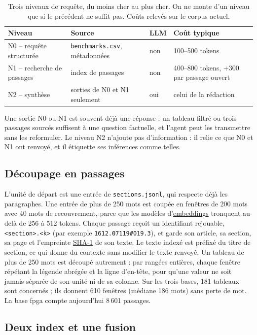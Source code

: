 \documentclass[11pt,a4paper]{article}
\newcommand{\cmd}[1]{\texttt{#1}}
\newcommand{\gl}[2]{\hyperlink{gl:#1}{\textcolor{glcolor}{#2}}}
\begin{document}
\begin{table}[ht]
\centering
\caption{Trois niveaux de requête, du moins cher au plus cher. On ne monte d'un niveau que
si le précédent ne suffit pas. Coûts relevés sur le corpus actuel.}
\label{tab:niveaux}
\small
\begin{tabularx}{\linewidth}{@{}lllL@{}}
\toprule
Niveau & Source & LLM & Coût typique \\
\midrule
N0 -- requête structurée & \cmd{benchmarks.csv}, métadonnées & non & 100--500 tokens \\
N1 -- recherche de passages & index de passages & non & 400--800 tokens, +300 par passage ouvert \\
N2 -- synthèse & sorties de N0 et N1 seulement & oui & celui de la rédaction \\
\bottomrule
\end{tabularx}
\end{table}

Une sortie N0 ou N1 est souvent déjà une réponse : un tableau filtré ou trois passages
sourcés suffisent à une question factuelle, et l'agent peut les transmettre sans les
reformuler. Le niveau N2 n'ajoute pas d'information : il relie ce que N0 et N1 ont renvoyé,
et il étiquette ses inférences comme telles.

\subsection{Découpage en passages}

L'unité de départ est une entrée de \cmd{sections.jsonl}, qui respecte déjà les
paragraphes. Une entrée de plus de 250 mots est coupée en fenêtres de 200 mots avec 40 mots
de recouvrement, parce que les modèles d'\gl{embedding}{embeddings} tronquent au-delà de 256 à 512 tokens.
Chaque passage reçoit un identifiant rejouable, \cmd{<section>.<k>} (par exemple
\cmd{1612.07119\#019.3}), et garde son article, sa section, sa page et l'empreinte \gl{SHA}{SHA-1} de
son texte. Le texte indexé est préfixé du titre de section, ce qui donne du contexte sans
modifier le texte renvoyé. Un tableau de plus de 250 mots est découpé autrement : par
rangées entières, chaque fenêtre répétant la légende abrégée et la ligne d'en-tête, pour
qu'une valeur ne soit jamais séparée de son unité ni de sa colonne. Sur les trois bases,
181 tableaux sont concernés ; ils donnent 610 fenêtres (médiane 186 mots) sans perte de
mot. La base fpga compte aujourd'hui 8\,601 passages.

\subsection{Deux index et une fusion}
\end{document}
